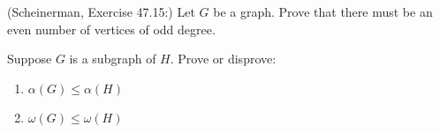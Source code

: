 \documentclass{article}
\theoremstyle{definition}
\begin{document}
\begin{question}
    (Scheinerman, Exercise 47.15:)
    Let $G$ be a graph. Prove that there must be an even number of vertices of odd degree.
\end{question}
\begin{solution}
\end{solution}

\begin{question}
    Suppose $G$ is a subgraph of $H$.  Prove or disprove:
\begin{enumerate}
	\item $\alpha(G) \leq \alpha(H)$
	\item $\omega(G) \leq \omega(H)$
	\end{enumerate}
\end{question}
\begin{solution}
\end{solution}
\end{document}
